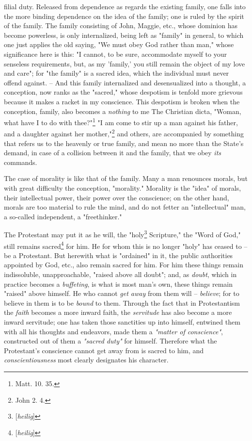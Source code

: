 \documentclass[a4paper]{book}
\begin{document}
filial duty. Released from dependence as regards the existing family, one 
falls into the more binding dependence on the idea of the family; one is ruled 
by the spirit of the family. The family consisting of John, Maggie, etc., 
whose dominion has become powerless, is only internalized, being left as 
"{}family"{} in general, to which one just applies the old saying, "{}We must 
obey God rather than man,"{} whose significance here is this: "{}I cannot, to 
be sure, accommodate myself to your senseless requirements, but, as my 
'family,' you still remain the object of my love and care"{}; for "{}the 
family"{} is a sacred idea, which the individual must never offend against. -- 
And this family internalized and desensualized into a thought, a conception, 
now ranks as the "{}sacred,"{} whose despotism is tenfold more grievous 
because it makes a racket in my conscience. This despotism is broken when the 
conception, family, also becomes a \textit{nothing} to me The Christian dicta, 
"{}Woman, what have I to do with thee?"{}\footnote{Matt. 10. 35.} "{}I am come 
to stir up a man against his father, and a daughter against her 
mother,"{}\footnote{John 2. 4.} and others, are accompanied by something that 
refers us to the heavenly or true family, and mean no more than the State's 
demand, in case of a collision between it and the family, that we obey 
\textit{its} commands.

The case of morality is like that of the family. Many a man renounces morals, 
but with great difficulty the conception, "{}morality."{} Morality is the 
"{}idea"{} of morals, their intellectual power, their power over the 
conscience; on the other hand, morals are too material to rule the mind, and 
do not fetter an "{}intellectual"{} man, a so-called independent, a 
"{}freethinker."{}

The Protestant may put it as he will, the "{}holy\footnote{[\textit{heilig}]} 
Scripture,"{} the "{}Word of God,"{} still remains 
sacred\footnote{[\textit{heilig}]} for him. He for whom this is no longer 
"{}holy"{} has ceased to -- be a Protestant. But herewith what is 
"{}ordained"{} in it, the public authorities appointed by God, etc., also 
remain sacred for him. For him these things remain indissoluble, 
unapproachable, "{}raised above all doubt"{}; and, as \textit{doubt}, which in 
practice becomes a \textit{buffeting}, is what is most man's own, these things 
remain "{}raised"{} above himself. He who cannot \textit{get away} from them 
will -- \textit{believe}; for to believe in them is to be \textit{bound} to 
them. Through the fact that in Protestantism the \textit{faith} becomes a more 
inward faith, the \textit{servitude} has also become a more inward servitude; 
one has taken those sanctities up into himself, entwined them with all his 
thoughts and endeavors, made them a \textit{"{}matter of conscience"{}}, 
constructed out of them a \textit{"{}sacred duty"{}} for himself. Therefore 
what the Protestant's conscience cannot get away from is sacred to him, and 
\textit{conscientiousness} most clearly designates his character.
\end{document}

